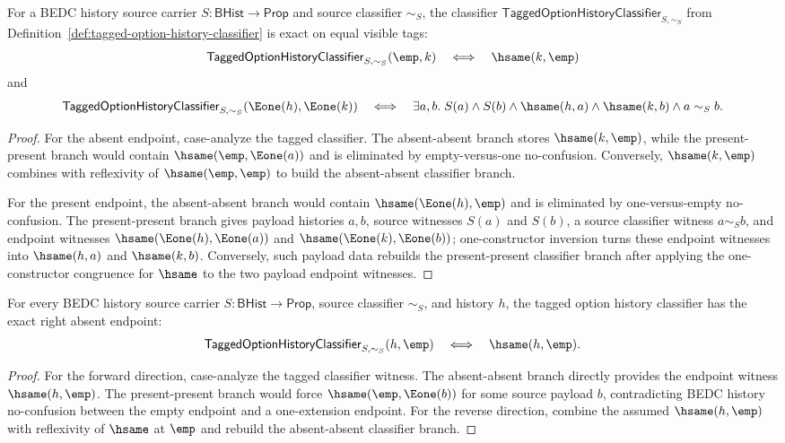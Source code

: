 \begin{theorem}
\label{thm:tagged-option-history-same-tag-exactness}
For a BEDC history source carrier $S:\mathsf{BHist}\to\mathsf{Prop}$ and source classifier $\sim_S$, the classifier $\mathsf{TaggedOptionHistoryClassifier}_{S,\sim_S}$ from Definition~\ref{def:tagged-option-history-classifier} is exact on equal visible tags:
$$
\mathsf{TaggedOptionHistoryClassifier}_{S,\sim_S}(\emp,k)
\quad\Longleftrightarrow\quad
\hsame(k,\emp)
$$
and
$$
\mathsf{TaggedOptionHistoryClassifier}_{S,\sim_S}(\Eone(h),\Eone(k))
\quad\Longleftrightarrow\quad
\exists a,b.\; S(a)\land S(b)\land \hsame(h,a)\land \hsame(k,b)\land a\sim_S b.
$$
\end{theorem}
\begin{proof}
For the absent endpoint, case-analyze the tagged classifier. The absent-absent branch stores $\hsame(k,\emp)$, while the present-present branch would contain $\hsame(\emp,\Eone(a))$ and is eliminated by empty-versus-one no-confusion. Conversely, $\hsame(k,\emp)$ combines with reflexivity of $\hsame(\emp,\emp)$ to build the absent-absent classifier branch.

For the present endpoint, the absent-absent branch would contain $\hsame(\Eone(h),\emp)$ and is eliminated by one-versus-empty no-confusion. The present-present branch gives payload histories $a,b$, source witnesses $S(a)$ and $S(b)$, a source classifier witness $a\sim_S b$, and endpoint witnesses $\hsame(\Eone(h),\Eone(a))$ and $\hsame(\Eone(k),\Eone(b))$; one-constructor inversion turns these endpoint witnesses into $\hsame(h,a)$ and $\hsame(k,b)$. Conversely, such payload data rebuilds the present-present classifier branch after applying the one-constructor congruence for $\hsame$ to the two payload endpoint witnesses.
\end{proof}

\begin{theorem}
\label{thm:tagged-option-history-right-absent-exactness}
For every BEDC history source carrier $S:\mathsf{BHist}\to\mathsf{Prop}$, source classifier $\sim_S$, and history $h$, the tagged option history classifier has the exact right absent endpoint:
$$
\mathsf{TaggedOptionHistoryClassifier}_{S,\sim_S}(h,\emp)
\quad\Longleftrightarrow\quad
\hsame(h,\emp).
$$
\end{theorem}
\begin{proof}
For the forward direction, case-analyze the tagged classifier witness. The absent-absent branch directly provides the endpoint witness $\hsame(h,\emp)$. The present-present branch would force $\hsame(\emp,\Eone(b))$ for some source payload $b$, contradicting BEDC history no-confusion between the empty endpoint and a one-extension endpoint. For the reverse direction, combine the assumed $\hsame(h,\emp)$ with reflexivity of $\hsame$ at $\emp$ and rebuild the absent-absent classifier branch.
\end{proof}

